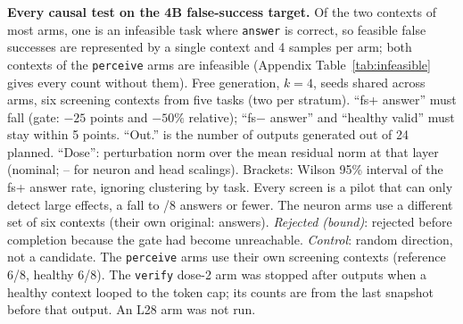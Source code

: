 \begin{table}[t]
\centering\scriptsize
\setlength{\tabcolsep}{3pt}
\resizebox{\linewidth}{!}{}
\caption{\textbf{Every causal test on the 4B false-success target.} Of the two \fsp{} contexts of most arms, one is an infeasible task where \texttt{answer} is correct, so feasible false successes are represented by a single context and 4 samples per arm; both \fsp{} contexts of the \texttt{perceive} arms are infeasible (Appendix Table~\ref{tab:infeasible} gives every count without them). Free generation, $k=4$, seeds shared across arms, six screening contexts from five tasks (two per stratum). ``fs+ answer'' must fall (gate: $-25$ points and $-50\%$ relative); ``fs$-$ answer'' and ``healthy valid'' must stay within 5 points. ``Out.'' is the number of outputs generated out of 24 planned. ``Dose'': perturbation norm over the mean residual norm at that layer (nominal; -- for neuron and head scalings). Brackets: Wilson 95\% interval of the fs+ answer rate, ignoring clustering by task. Every screen is a pilot that can only detect large effects, a fall to \gateMaxAnswers/8 \fsp{} answers or fewer. The neuron arms use a different set of six contexts (their own original: \cNeuronBase{} \fsp{} answers). \emph{Rejected (bound)}: rejected before completion because the gate had become unreachable. \emph{Control}: random direction, not a candidate. The \texttt{perceive} arms use their own screening contexts (reference \fsp{} 6/8, healthy 6/8). The \texttt{verify} dose-2 arm was stopped after \verifyRejCompleted{} outputs when a healthy context looped to the token cap; its counts are from the last snapshot before that output. An L28 arm was not run.}
\label{tab:causal}
\end{table}
